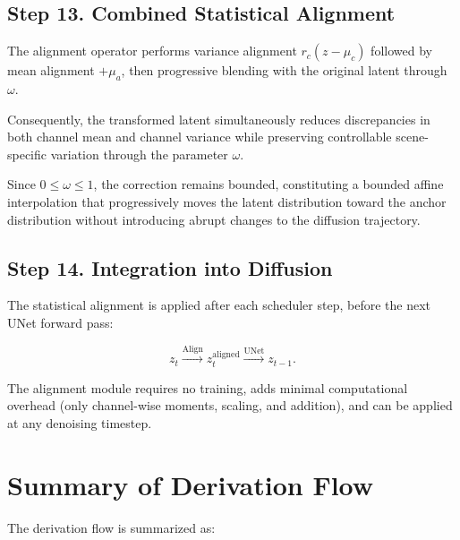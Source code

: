 \documentclass[12pt]{article}
\begin{document}
\subsection{Step 13. Combined Statistical Alignment}

The alignment operator performs variance alignment $r_c(z - \mu_c)$ followed by mean alignment $+\mu_a$, then progressive blending with the original latent through $\omega$.

Consequently, the transformed latent simultaneously reduces discrepancies in both channel mean and channel variance while preserving controllable scene-specific variation through the parameter $\omega$.

Since $0 \le \omega \le 1$, the correction remains bounded, constituting a bounded affine interpolation that progressively moves the latent distribution toward the anchor distribution without introducing abrupt changes to the diffusion trajectory.

\subsection{Step 14. Integration into Diffusion}

The statistical alignment is applied after each scheduler step, before the next UNet forward pass:

\begin{equation}
z_t \xrightarrow{\text{Align}} z_t^{\mathrm{aligned}} \xrightarrow{\text{UNet}} z_{t-1}.
\end{equation}

The alignment module requires no training, adds minimal computational overhead (only channel-wise moments, scaling, and addition), and can be applied at any denoising timestep.

\section{Summary of Derivation Flow}

The derivation flow is summarized as:
\end{document}
